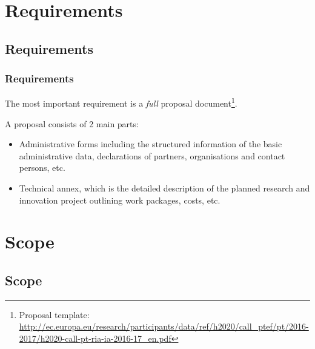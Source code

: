 \documentclass[compress,9pt,xcolor={dvipsnames,table}]{beamer}
\begin{document}
\begin{frame}
\end{frame}


\section{Requirements}
\subsection{Requirements}

\begin{frame}\frametitle{Requirements}
The most important requirement is a \emph{full} proposal document\footnote{Proposal template: \url{http://ec.europa.eu/research/participants/data/ref/h2020/call_ptef/pt/2016-2017/h2020-call-pt-ria-ia-2016-17_en.pdf}}.

A proposal consists of 2 main parts:
\begin{itemize}
  \item Administrative forms including the structured information of the basic administrative data, declarations of partners, organisations and contact persons, etc.
  \item Technical annex, which is the detailed description of the planned research and innovation project outlining work packages, costs, etc.
\end{itemize}

\end{frame}

\section{Scope}
\subsection{Scope}
\end{document}
